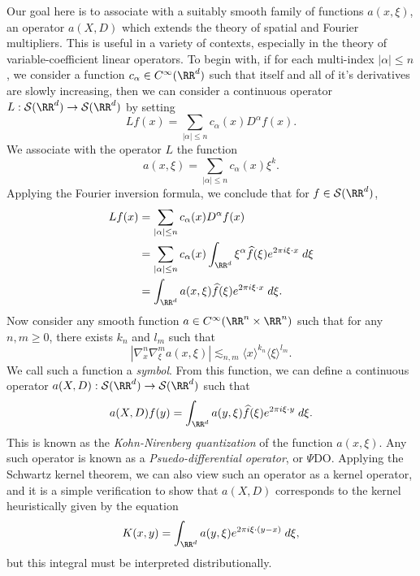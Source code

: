 Our goal here is to associate with a suitably smooth family of functions $a(x,\xi)$, an operator $a(X,D)$ which extends the theory of spatial and Fourier multipliers. This is useful in a variety of contexts, especially in the theory of variable-coefficient linear operators. To begin with, if for each multi-index $|\alpha| \leq n$, we consider a function $c_\alpha \in C^\infty(\RR^d)$ such that itself and all of it's derivatives are slowly increasing, then we can consider a continuous operator $L: \mathcal{S}(\RR^d) \to \mathcal{S}(\RR^d)$ by setting
%
\[ Lf(x) = \sum_{|\alpha| \leq n} c_\alpha(x) D^\alpha f(x). \]
%
We associate with the operator $L$ the function
%
\[ a(x,\xi) = \sum_{|\alpha| \leq n} c_\alpha(x) \xi^k. \]
%
Applying the Fourier inversion formula, we conclude that for $f \in \mathcal{S}(\RR^d)$,
%
\begin{align*}
  Lf(x) &= \sum_{|\alpha| \leq n} c_\alpha(x) D^\alpha f(x)\\
  &= \sum_{|\alpha| \leq n} c_\alpha(x) \int_{\RR^d} \xi^\alpha \widehat{f}(\xi) e^{2 \pi i \xi \cdot x}\; d\xi\\
  &= \int_{\RR^d} a(x,\xi) \widehat{f}(\xi) e^{2 \pi i \xi \cdot x}\; d\xi.
\end{align*}
%
Now consider any smooth function $a \in C^\infty(\RR^n \times \RR^n)$ such that for any $n,m \geq 0$, there exists $k_n$ and $l_m$ such that
%
\[ |\nabla_x^n \nabla_\xi^m a(x,\xi)| \lesssim_{n,m} \langle x \rangle^{k_n} \langle \xi \rangle^{l_m}. \]
%
We call such a function a \emph{symbol}. From this function, we can define a continuous operator $a(X,D): \mathcal{S}(\RR^d) \to \mathcal{S}(\RR^d)$ such that
%
\[ a(X,D) f(y) = \int_{\RR^d} a(y,\xi) \widehat{f}(\xi) e^{2 \pi i \xi \cdot y}\; d\xi. \]
%
This is known as the \emph{Kohn-Nirenberg quantization} of the function $a(x,\xi)$. Any such operator is known as a \emph{Psuedo-differential operator}, or $\Psi$DO. Applying the Schwartz kernel theorem, we can also view such an operator as a kernel operator, and it is a simple verification to show that $a(X,D)$ corresponds to the kernel heuristically given by the equation
%
\[ K(x,y) = \int_{\RR^d} a(y,\xi) e^{2 \pi i \xi \cdot (y - x)}\; d\xi, \]
%
but this integral must be interpreted distributionally.

